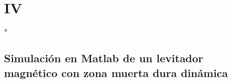 \chapter{IV}*
\section{Simulación en Matlab de un levitador magnético con zona muerta dura dinámica}

